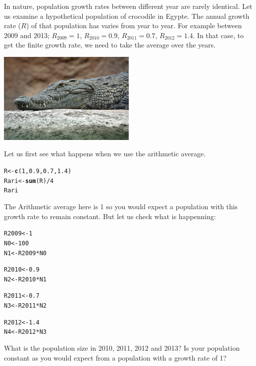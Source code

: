 \documentclass{article}\usepackage[]{graphicx}\usepackage[]{color}
\makeatletter
\newcommand{\hlnum}[1]{\textcolor[rgb]{0.686,0.059,0.569}{#1}}%
\newcommand{\hlopt}[1]{\textcolor[rgb]{0,0,0}{#1}}%
\newcommand{\hlstd}[1]{\textcolor[rgb]{0.345,0.345,0.345}{#1}}%
\newcommand{\hlkwb}[1]{\textcolor[rgb]{0.69,0.353,0.396}{#1}}%
\newcommand{\hlkwd}[1]{\textcolor[rgb]{0.737,0.353,0.396}{\textbf{#1}}}%
\newenvironment{kframe}{%
 \def\at@end@of@kframe{}%
 \ifinner\ifhmode%
  \def\at@end@of@kframe{\end{minipage}}%
  \begin{minipage}{\columnwidth}%
 \fi\fi%
 \def\FrameCommand##1{\hskip\@totalleftmargin \hskip-\fboxsep
 \colorbox{shadecolor}{##1}\hskip-\fboxsep
     \hskip-\linewidth \hskip-\@totalleftmargin \hskip\columnwidth}%
 \MakeFramed {\advance\hsize-\width
   \@totalleftmargin\z@ \linewidth\hsize
   \@setminipage}}%
 {\par\unskip\endMakeFramed%
 \at@end@of@kframe}
\newenvironment{knitrout}{}{} %
\makeatother
\begin{document}
In nature, population growth rates between different year are rarely identical. Let us examine a hypothetical population of crocodile in Egypte. The annual growth rate ($R$) of that population has varies from year to year. For example between 2009 and 2013; $R_{2009}=1$, $R_{2010}=0.9$, $R_{2011}=0.7$, $R_{2012}=1.4$. In that case, to get the finite growth rate, we need to take the average over the years. 
\vspace{1.5ex}
\begin{center}
\includegraphics[width=0.5\textwidth]{crocodile.jpg}
\end{center}

\noindent Let us first see what happens when we use the arithmetic average. 
\begin{knitrout}
\color{fgcolor}\begin{kframe}
\begin{alltt}
\hlstd{R}\hlkwb{<-}\hlkwd{c}\hlstd{(}\hlnum{1}\hlstd{,} \hlnum{0.9}\hlstd{,} \hlnum{0.7}\hlstd{,} \hlnum{1.4}\hlstd{)}
\hlstd{Rari}\hlkwb{<-}\hlkwd{sum}\hlstd{(R)}\hlopt{/}\hlnum{4}
\hlstd{Rari}
\end{alltt}
\end{kframe}
\end{knitrout}

\noindent The Arithmetic average here is 1 so you would expect a population with this growth rate to remain constant. But let us check what is happenning:

\begin{knitrout}
\color{fgcolor}\begin{kframe}
\begin{alltt}
\hlstd{R2009}\hlkwb{<-}\hlnum{1}
\hlstd{N0}\hlkwb{<-}\hlnum{100}
\hlstd{N1}\hlkwb{<-}\hlstd{R2009}\hlopt{*}\hlstd{N0}

\hlstd{R2010}\hlkwb{<-}\hlnum{0.9}
\hlstd{N2}\hlkwb{<-}\hlstd{R2010}\hlopt{*}\hlstd{N1}

\hlstd{R2011}\hlkwb{<-}\hlnum{0.7}
\hlstd{N3}\hlkwb{<-}\hlstd{R2011}\hlopt{*}\hlstd{N2}

\hlstd{R2012}\hlkwb{<-}\hlnum{1.4}
\hlstd{N4}\hlkwb{<-}\hlstd{R2012}\hlopt{*}\hlstd{N3}
\end{alltt}
\end{kframe}
\end{knitrout}
\noindent What is the population size in 2010, 2011, 2012 and 2013? Is your population constant as you would expect from a population with a growth rate of 1?
\end{document}
